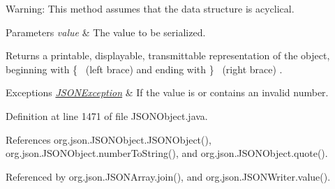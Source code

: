 Warning\-: This method assumes that the data structure is acyclical.


\begin{DoxyParams}{Parameters}
{\em value} & The value to be serialized. \\
\hline
\end{DoxyParams}
\begin{DoxyReturn}{Returns}
a printable, displayable, transmittable representation of the object, beginning with {\ttfamily \{}~
\footnotesize (left brace)
\normalsize  and ending with {\ttfamily \}}~
\footnotesize (right brace)
\normalsize . 
\end{DoxyReturn}

\begin{DoxyExceptions}{Exceptions}
{\em \hyperlink{classorg_1_1json_1_1_j_s_o_n_exception}{J\-S\-O\-N\-Exception}} & If the value is or contains an invalid number. \\
\hline
\end{DoxyExceptions}


Definition at line 1471 of file J\-S\-O\-N\-Object.\-java.



References org.\-json.\-J\-S\-O\-N\-Object.\-J\-S\-O\-N\-Object(), org.\-json.\-J\-S\-O\-N\-Object.\-number\-To\-String(), and org.\-json.\-J\-S\-O\-N\-Object.\-quote().



Referenced by org.\-json.\-J\-S\-O\-N\-Array.\-join(), and org.\-json.\-J\-S\-O\-N\-Writer.\-value().


